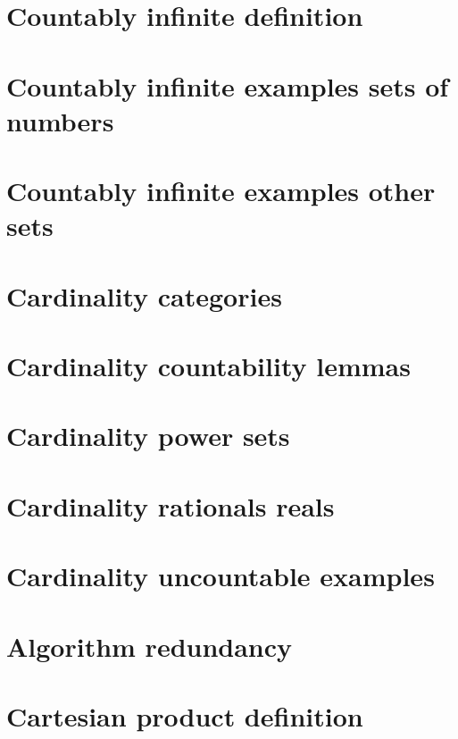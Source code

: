 \section*{Countably infinite definition}

\vfill
\section*{Countably infinite examples sets of numbers}

\vfill
\section*{Countably infinite examples other sets}

\vfill
\section*{Cardinality categories}

\vfill
\section*{Cardinality countability lemmas}

\vfill
\section*{Cardinality power sets}

\vfill
\section*{Cardinality rationals reals}

\vfill
\section*{Cardinality uncountable examples}

\vfill
\section*{Algorithm redundancy}

\vfill
\section*{Cartesian product definition}

\vfill
